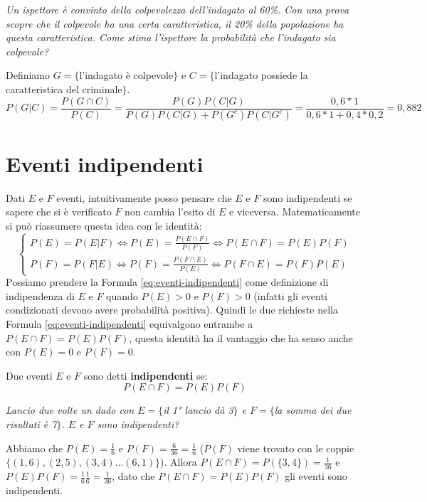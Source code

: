 \begin{Example}{}{}
    \textit{Un ispettore è convinto della colpevolezza dell'indagato al 60\%. Con una prova scopre che il colpevole ha una certa caratteristica, il 20\% della popolazione ha questa caratteristica. Come stima l'ispettore la probabilità che l'indagato sia colpevole?}

    Definiamo $G=\{$l'indagato è colpevole$\}$ e $C=\{$l'indagato possiede la caratteristica del criminale$\}$.
    \begin{equation*}
        P(G|C)=\frac{P(G\cap C)}{P(C)}=\frac{P(G)P(C|G)}{P(G)P(C|G)+P(G^c)P(C|G^c)}=\frac{0,6*1}{0,6*1+0,4*0,2}=0,882
    \end{equation*}
\end{Example}

\section{Eventi indipendenti}
Dati $E$ e $F$ eventi, intuitivamente posso pensare che $E$ e $F$ sono indipendenti se sapere che si è verificato $F$ non cambia l'esito di $E$ e viceversa. Matematicamente si può riassumere questa idea con le identità:
\begin{equation}\label{eq:eventi-indipendenti}
    \begin{cases}
        P(E)=P(E|F)\iff P(E)=\frac{P(E\cap F)}{P(F)}\iff P(E\cap F)=P(E)P(F)\\
        P(F)=P(F|E)\iff P(F)=\frac{P(F\cap E)}{P(E)}\iff P(F\cap E)=P(F)P(E)
    \end{cases}
\end{equation}
Possiamo prendere la Formula \ref{eq:eventi-indipendenti} come definizione di indipendenza di $E$ e $F$ quando $P(E)>0$ e $P(F)>0$ (infatti gli eventi condizionati devono avere probabilità positiva). Quindi le due richieste nella Formula \ref{eq:eventi-indipendenti} equivalgono entrambe a $P(E\cap F)=P(E)P(F)$, questa identità ha il vantaggio che ha senso anche con $P(E)=0$ e $P(F)=0$.

\begin{redbar}
    Due eventi $E$ e $F$ sono detti \textbf{indipendenti} se:
    \begin{equation*}
        P(E\cap F)=P(E)P(F)    
    \end{equation*}
\end{redbar}

\begin{Example}{}{}
    \textit{Lancio due volte un dado con $E=\{$il 1° lancio dà 3$\}$ e $F=\{$la somma dei due risultati è 7$\}$. $E$ e $F$ sono indipendenti?}

    Abbiamo che $P(E)=\frac{1}{6}$ e $P(F)=\frac{6}{36}=\frac{1}{6}$ ($P(F)$ viene trovato con le coppie $\{(1,6),(2,5),(3,4)...(6,1)\}$). Allora $P(E\cap F)=P(\{3,4\})=\frac{1}{36}$ e $P(E)P(F)=\frac{1}{6}\frac{1}{6}=\frac{1}{36}$, dato che $P(E\cap F)=P(E)P(F)$ gli eventi sono indipendenti.
\end{Example}

